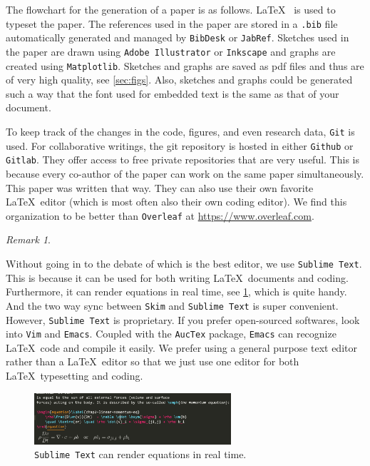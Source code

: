 \documentclass[authoryear,3p,times,preprint,review,fleqn]{elsarticle}
\numberwithin{equation}{section}
\theoremstyle{remark}
\newtheorem{rmk}{Remark}
\begin{document}
The flowchart for the generation of a paper is as follows. \LaTeX~ is used to typeset the paper. The references used in the paper are stored in a \texttt{.bib} file automatically generated and managed by \texttt{BibDesk} or \texttt{JabRef}. Sketches used in the paper are drawn using \texttt{Adobe Illustrator} or \texttt{Inkscape} and graphs are created using \texttt{Matplotlib}. Sketches and graphs are saved as pdf files and thus are of very high quality, see \cref{sec:figs}. Also, sketches and graphs could be generated such a way that the font used for embedded text is the same as that of your document.


To keep track of the changes in the code, figures, and even research data, \texttt{Git} is used. For collaborative writings, the git repository is hosted in either \texttt{Github} or \texttt{Gitlab}. They offer access to free private repositories that are very useful. This is because every co-author of the paper can work on the same paper simultaneously. This paper was written that way. 
They can also use their own favorite \LaTeX\ editor (which is most often also their own coding editor). We find this organization to be better than \texttt{Overleaf} at \url{https://www.overleaf.com}.





\begin{rmk}\label{rm:a}

Without going in to the debate of which is the best editor, we use \texttt{Sublime Text}. This is
because it can be used for both writing \LaTeX\ documents and coding. Furthermore, it can render equations in real time, see  \cref{fig:sublime-text}, which is quite handy. And the two way sync between \texttt{Skim} and \texttt{Sublime Text} is super convenient. However, \texttt{Sublime Text} is proprietary. If you prefer open-sourced softwares, look into \texttt{Vim} and \texttt{Emacs}. Coupled with the \texttt{AucTex} package, \texttt{Emacs} can recognize \LaTeX\ code and compile it easily. We prefer using a general purpose text editor rather than a \LaTeX\ editor so that we just use one editor  for both \LaTeX\ typesetting and coding. 


\begin{figure}[h!]
  \centering 
   \includegraphics[width=0.65\textwidth]{sublime-text}
   \caption{\texttt{Sublime Text} can render equations in real time.}
\label{fig:sublime-text}
\end{figure}
\end{rmk}
\end{document}
